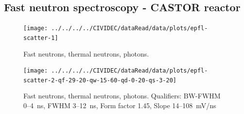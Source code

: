 \documentclass[12pt]{packages/mytustyle}  %
\begin{document}
\subsection{Fast neutron spectroscopy - CASTOR reactor}


\begin{figure}[!t]
\centering
\texttt{[image: ../../../../CIVIDEC/dataRead/data/plots/epfl-scatter-1]}
\caption{Fast neutrons, thermal neutrons, photons.}
\label{fig:scatterepfl1}
\end{figure}

\clearpage
\begin{figure}[!t]
\centering
\texttt{[image: ../../../../CIVIDEC/dataRead/data/plots/epfl-scatter-2-qf-29-20-qw-15-60-qd-0-20-qs-3-20]}
\caption{Fast neutrons, thermal neutrons, photons. Qualifiers: BW-FWHM 0--4~ns, FWHM 3--12~ns, Form factor 1.45, Slope 14--108~mV/ns}
\label{fig:scatterepfl2}
\end{figure}










\end{document}
